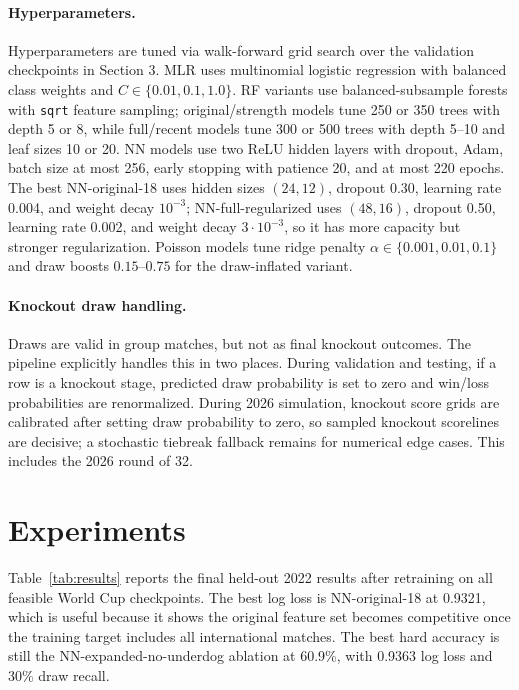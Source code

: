 \documentclass{article}
\begin{document}
\paragraph{Hyperparameters.}
Hyperparameters are tuned via walk-forward grid search over the validation
checkpoints in Section 3. MLR uses multinomial logistic regression with
balanced class weights and $C\in\{0.01,0.1,1.0\}$. RF variants use balanced-subsample forests with
\texttt{sqrt} feature sampling; original/strength models tune 250 or 350 trees
with depth 5 or 8, while full/recent models tune 300 or 500 trees with depth
5--10 and leaf sizes 10 or 20. NN models use two ReLU hidden layers with dropout,
Adam, batch size at most 256, early stopping with patience 20, and at most 220
epochs. The best NN-original-18 uses hidden sizes $(24,12)$, dropout 0.30,
learning rate 0.004, and weight decay $10^{-3}$; NN-full-regularized uses
$(48,16)$, dropout 0.50, learning rate 0.002, and weight decay $3\cdot10^{-3}$,
so it has more capacity but stronger regularization. Poisson models tune
ridge penalty $\alpha\in\{0.001,0.01,0.1\}$ and draw boosts
$0.15$--$0.75$ for the draw-inflated variant.

\paragraph{Knockout draw handling.}
Draws are valid in group matches, but not as final knockout outcomes. The
pipeline explicitly handles this in two places. During validation and testing,
if a row is a knockout stage, predicted draw probability is set to zero and
win/loss probabilities are renormalized. During 2026 simulation, knockout
score grids are calibrated after setting draw probability to zero, so sampled
knockout scorelines are decisive; a stochastic tiebreak fallback remains for
numerical edge cases. This includes the 2026 round of 32.

\section{Experiments}

Table~\ref{tab:results} reports the final held-out 2022 results after
retraining on all feasible World Cup checkpoints. The best log loss is
NN-original-18 at 0.9321, which is useful because it shows the original
feature set becomes competitive once the training target includes all
international matches. The best hard accuracy is still the
NN-expanded-no-underdog ablation at 60.9\%, with 0.9363 log loss and 30\%
draw recall.
\end{document}
